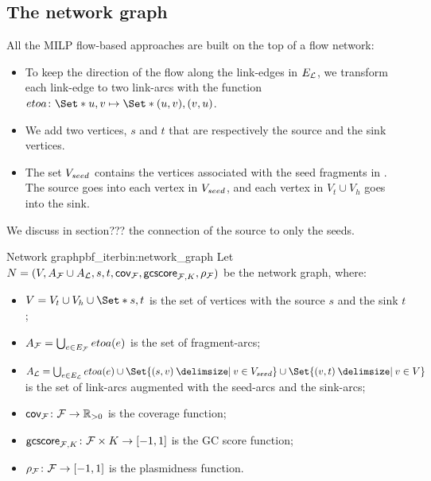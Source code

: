 \subsection{The network graph}\label{sec:pbf_iterbin:network}

All the MILP flow-based approaches are built on the top of a flow network:

\begin{itemize}
  \item To keep the direction of the flow along the link-edges in \(E_{\mathcal{L}}{}\), we transform each link-edge to two link-arcs with the function \(etoa \colon \Set*{u, v} \mapsto \Set*{(u, v), (v, u)}\).
  \item We add two vertices, \(s\) and \(t\) that are respectively the source and the sink vertices.
  \item The set \(V_{seed}{}\) contains the vertices associated with the seed fragments in \SeedFrags{}.
    The source goes into each vertex in \(V_{seed}{}\), and each vertex in \(V_t \cup V_h\) goes into the sink.
\end{itemize}

\begin{notebox}
  We discuss in section??? the connection of the source to only the seeds.
\end{notebox}

\begin{definition}{Network graph}{pbf_iterbin:network_graph}
  Let \(N = (V, A_{\mathcal{F}}{} \cup A_{\mathcal{L}}{}, s, t, \mathsf{cov}_{\mathcal{F}{}}, \mathsf{gcscore}_{\mathcal{F}{}, K}, \rho_{\mathcal{F}{}})\) be the network graph, where:

  \begin{itemize}
    \item \( V = V_t \cup V_h \cup \Set*{s, t} \) is the set of vertices with the source \(s\) and the sink \(t\);
    \item \( A_{\mathcal{F}}{} = \bigcup_{e \in E_{\mathcal{F}}{}} etoa(e) \) is the set of fragment-arcs;
    \item \( A_\Links{} = \bigcup_{e \in E_\Links{}} etoa(e) \cup \Set{(s, v) \given v \in \VSeed{}} \cup \Set{(v, t) \given v \in V} \) is the set of link-arcs augmented with the seed-arcs and the sink-arcs;
    \item \( \mathsf{cov}_{\mathcal{F}{}} \colon \mathcal{F}{} \to \mathbb{R}{}_{> 0} \) is the coverage function;
    \item \( \mathsf{gcscore}_{\mathcal{F}{}, K} \colon \mathcal{F}{} \times K \to [-1, 1] \) is the GC score function;
    \item \( \rho_{\mathcal{F}{}} \colon \mathcal{F}{} \to [-1, 1] \) is the plasmidness function.
  \end{itemize}
\end{definition}
